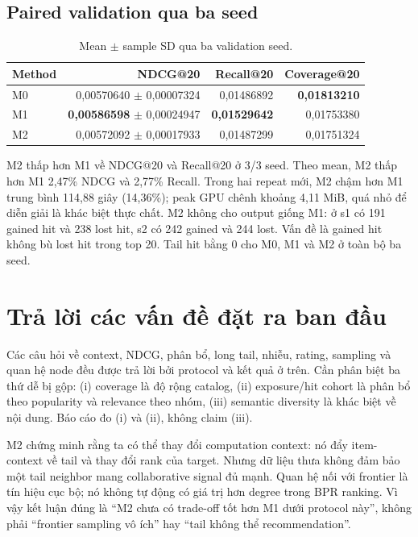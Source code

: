 \documentclass[12pt,a4paper]{article}
\begin{document}
\subsection{Paired validation qua ba seed}
\begin{table}[h]
\centering
\caption{Mean $\pm$ sample SD qua ba validation seed.}\label{tab:paired}
\begin{tabular}{lrrr}
\toprule
Method & NDCG@20 & Recall@20 & Coverage@20 \\
\midrule
M0 & 0,00570640 $\pm$ 0,00007324 & 0,01486892 & \textbf{0,01813210} \\
M1 & \textbf{0,00586598} $\pm$ 0,00024947 & \textbf{0,01529642} & 0,01753380 \\
M2 & 0,00572092 $\pm$ 0,00017933 & 0,01487299 & 0,01751324 \\
\bottomrule
\end{tabular}
\end{table}

M2 thấp hơn M1 về NDCG@20 và Recall@20 ở 3/3 seed. Theo mean, M2 thấp hơn M1 2,47\% NDCG và 2,77\% Recall. Trong hai repeat mới, M2 chậm hơn M1 trung bình 114,88 giây (14,36\%); peak GPU chênh khoảng 4,11 MiB, quá nhỏ để diễn giải là khác biệt thực chất. M2 không cho output giống M1: ở s1 có 191 gained hit và 238 lost hit, s2 có 242 gained và 244 lost. Vấn đề là gained hit không bù lost hit trong top 20. Tail hit bằng 0 cho M0, M1 và M2 ở toàn bộ ba seed.

\section{Trả lời các vấn đề đặt ra ban đầu}
Các câu hỏi về context, NDCG, phân bổ, long tail, nhiễu, rating, sampling và quan hệ node đều được trả lời bởi protocol và kết quả ở trên. Cần phân biệt ba thứ dễ bị gộp: (i) coverage là độ rộng catalog, (ii) exposure/hit cohort là phân bổ theo popularity và relevance theo nhóm, (iii) semantic diversity là khác biệt về nội dung. Báo cáo đo (i) và (ii), không claim (iii). 

M2 chứng minh rằng ta có thể thay đổi computation context: nó đẩy item-context về tail và thay đổi rank của target. Nhưng dữ liệu thưa không đảm bảo một tail neighbor mang collaborative signal đủ mạnh. Quan hệ nối với frontier là tín hiệu cục bộ; nó không tự động có giá trị hơn degree trong BPR ranking. Vì vậy kết luận đúng là ``M2 chưa có trade-off tốt hơn M1 dưới protocol này'', không phải ``frontier sampling vô ích'' hay ``tail không thể recommendation''.
\end{document}
